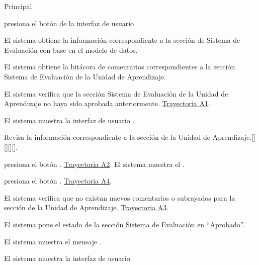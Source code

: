 \begin{UCtrayectoria}{Principal}

    \UCpaso[\UCactor] presiona el botón   de la interfaz de usuario 

    \UCpaso El sistema obtiene la información correspondiente a la sección de Sistema de Evaluación con base en el modelo de datos.
    
    \UCpaso El sistema obtiene la bitácora de comentarios correspondientes a la sección Sistema de Evaluación de la Unidad de Aprendizaje. 
    
    \UCpaso El sistema verifica que la sección Sistema de Evaluación de la Unidad de Aprendizaje no haya sido aprobada anteriormente.  \hyperlink{SP2-CU9-A1}{Trayectoria A1}. 
    
    \UCpaso El sistema muestra la interfaz de usuario  . 
    
    \UCpaso[\UCactor] Revisa la información correspondiente a la sección de la Unidad de Aprendizaje.[][][][].
    
    \UCpaso[\UCactor] presiona el botón . \hyperlink{SP2-CU9-A2}{Trayectoria A2}.
    \UCpaso El sistema muestra el .
    
    \UCpaso [\UCactor] presiona el botón . \hyperlink{SP2-CU9-A4}{Trayectoria A4}.
    
    \UCpaso	El sistema verifica que no existan nuevos comentarios o subrayados para la sección de la Unidad de Aprendizaje.  \hyperlink{SP2-CU9-A3}{Trayectoria A3}. 
    
    \UCpaso El sistema pone el estado de la sección Sistema de Evaluación en “Aprobado”.
    
    \UCpaso El sistema muestra el mensaje .

    \UCpaso El sistema muestra la interfaz de usuario 

\end{UCtrayectoria}



